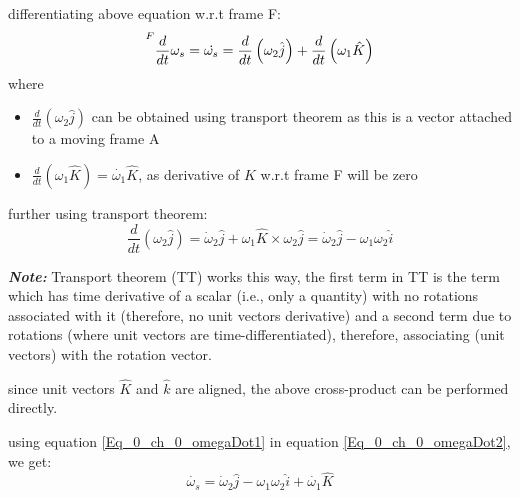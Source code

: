 differentiating above equation w.r.t frame F:
\begin{equation} \label{Eq_0_ch_0_omegaDot2}
	\prescript{F}{}{\frac{d}{dt}\omega_{s}} = \dot{\omega_{s}} = \frac{d}{dt}\left( \omega_{2} \hat{j} \right) + \frac{d}{dt}\left( \omega_{1}\hat{K} \right)
\end{equation}
where
\begin{itemize}
	\item $\frac{d}{dt}\left( \omega_{2} \hat{j} \right)$ can be obtained using transport theorem as this is a vector attached to a moving frame A
	\item $\frac{d}{dt}\left( \omega_{1}\hat{K} \right) = \dot{\omega_{1}}\hat{K}$, as derivative of $\hat{K}$ w.r.t frame F will be zero
\end{itemize}
further using transport theorem:
\begin{equation} \label{Eq_0_ch_0_omegaDot1}
	\frac{d}{dt}\left( \omega_{2} \hat{j} \right) = \dot{\omega}_{2}\hat{j} + \omega_{1}\hat{K} \times \omega_{2} \hat{j} = \dot{\omega}_{2}\hat{j} - \omega_{1}\omega_{2}\hat{i}
\end{equation}

\textbf{\textit{Note: }} Transport theorem (TT) works this way, the first term in TT is the term which has time derivative of a scalar (i.e., only a quantity) with no rotations associated with it (therefore, no unit vectors derivative) and a second term due to rotations (where unit vectors are time-differentiated), therefore, associating (unit vectors) with the rotation vector.

since unit vectors $\hat{K}$ and $\hat{k}$ are aligned, the above cross-product can be performed directly.

using equation \eqref{Eq_0_ch_0_omegaDot1} in equation \ref{Eq_0_ch_0_omegaDot2}, we get:
\begin{equation}
	\dot{\omega_{s}} = \dot{\omega}_{2}\hat{j} - \omega_{1}\omega_{2}\hat{i} + \dot{\omega_{1}}\hat{K}
\end{equation}

